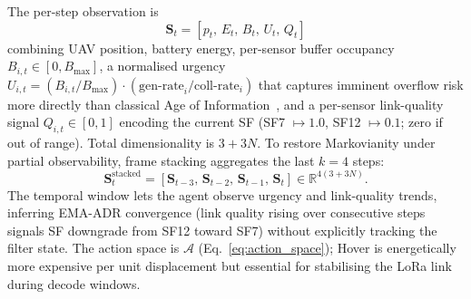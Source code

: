 The per-step observation is
\begin{equation}
    \mathbf{S}_t = [p_t,\, E_t,\, B_t,\, U_t,\, Q_t]
    \label{eq:state_vector}
\end{equation}
combining UAV position, battery energy, per-sensor buffer
occupancy $B_{i,t}\in[0, B_{\max}]$, a normalised urgency
$U_{i,t} = (B_{i,t}/B_{\max})\cdot(\text{gen-rate}_i/\text{coll-rate}_i)$
that captures imminent overflow risk more directly than classical
Age of Information~\cite{kaul2012realtime,abdelmagid2019aoi}, and a
per-sensor link-quality signal $Q_{i,t}\in[0,1]$ encoding the current
SF (SF7 $\mapsto 1.0$, SF12 $\mapsto 0.1$; zero if out of range).
Total dimensionality is $3 + 3N$. To restore Markovianity under
partial observability, frame stacking aggregates the last $k=4$ steps:
\begin{equation}
    \mathbf{S}_t^{\mathrm{stacked}}
    = [\mathbf{S}_{t-3},\, \mathbf{S}_{t-2},\, \mathbf{S}_{t-1},\, \mathbf{S}_t]
    \in \mathbb{R}^{4(3+3N)}.
    \label{eq:stacked_state}
\end{equation}
The temporal window lets the agent observe urgency and link-quality
trends, inferring EMA-ADR convergence (link quality rising over
consecutive steps signals SF downgrade from SF12 toward SF7) without
explicitly tracking the filter state. The action space is
$\mathcal{A}$ (Eq.~\ref{eq:action_space}); Hover is energetically
more expensive per unit displacement but essential for stabilising
the LoRa link during decode windows.
